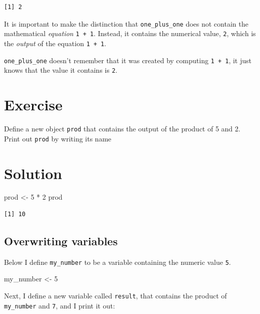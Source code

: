 \documentclass[
  letterpaper,
  DIV=11,
  numbers=noendperiod]{scrreprt}
\newenvironment{Shaded}{\begin{snugshade}}{\end{snugshade}}
\newcommand{\DecValTok}[1]{\textcolor[rgb]{0.68,0.00,0.00}{#1}}
\newcommand{\NormalTok}[1]{\textcolor[rgb]{0.00,0.23,0.31}{#1}}
\newcommand{\OtherTok}[1]{\textcolor[rgb]{0.00,0.23,0.31}{#1}}
\newcommand{\SpecialCharTok}[1]{\textcolor[rgb]{0.37,0.37,0.37}{#1}}
\begin{document}
\begin{verbatim}
[1] 2
\end{verbatim}

It is important to make the distinction that \texttt{one\_plus\_one}
does not contain the mathematical \emph{equation} \texttt{1\ +\ 1}.
Instead, it contains the numerical value, \texttt{2}, which is the
\emph{output} of the equation \texttt{1\ +\ 1}.

\texttt{one\_plus\_one} doesn't remember that it was created by
computing \texttt{1\ +\ 1}, it just knows that the value it contains is
\texttt{2}.

\section{Exercise}

Define a new object \texttt{prod} that contains the output of the
product of 5 and 2. Print out \texttt{prod} by writing its name

\section{Solution}

\begin{Shaded}
\begin{Highlighting}[]
\NormalTok{prod }\OtherTok{\textless{}{-}} \DecValTok{5} \SpecialCharTok{*} \DecValTok{2}
\NormalTok{prod}
\end{Highlighting}
\end{Shaded}

\begin{verbatim}
[1] 10
\end{verbatim}

\subsection{Overwriting variables}\label{overwriting-variables}

Below I define \texttt{my\_number} to be a variable containing the
numeric value \texttt{5}.

\begin{Shaded}
\begin{Highlighting}[]
\NormalTok{my\_number }\OtherTok{\textless{}{-}} \DecValTok{5}
\end{Highlighting}
\end{Shaded}

Next, I define a new variable called \texttt{result}, that contains the
product of \texttt{my\_number} and \texttt{7}, and I print it out:
\end{document}
